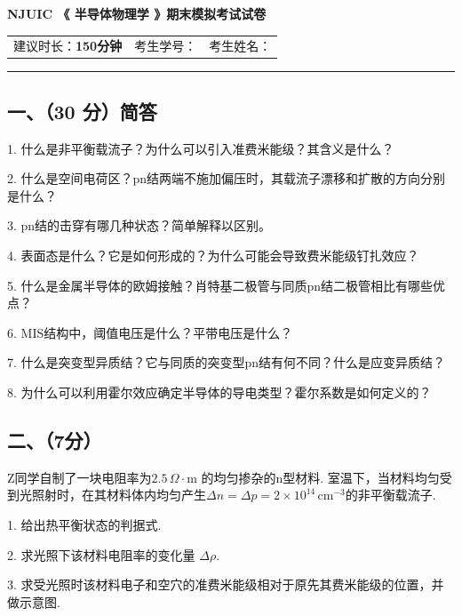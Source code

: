 \documentclass{ctexart}
\begin{document}
\vspace{1em}
\begin{center}

\textbf{\LARGE NJUIC 《 半导体物理学 》期末模拟考试试卷}
\end{center}

\begin{center}
\begin{tabular}{m{} m{} m{}}
     
     建议时长：\textbf{150分钟} & 考生学号：&考生姓名：
\end{tabular}
\end{center}
\vspace{-0.3cm}
\hrule height 0.5pt

\subsection*{一、（30 分）简答}

1. 什么是非平衡载流子？为什么可以引入准费米能级？其含义是什么？\par
2. 什么是空间电荷区？pn结两端不施加偏压时，其载流子漂移和扩散的方向分别是什么？ \par
3. pn结的击穿有哪几种状态？简单解释以区别。\par
4. 表面态是什么？它是如何形成的？为什么可能会导致费米能级钉扎效应？\par
5. 什么是金属半导体的欧姆接触？肖特基二极管与同质pn结二极管相比有哪些优点？\par
6. MIS结构中，阈值电压是什么？平带电压是什么？\par
7. 什么是突变型异质结？它与同质的突变型pn结有何不同？什么是应变异质结？\par
8. 为什么可以利用霍尔效应确定半导体的导电类型？霍尔系数是如何定义的？\par

\newpage

\subsection*{二、（7分）}

Z同学自制了一块电阻率为$2.5 \, \Omega \cdot $m 的均匀掺杂的n型材料. 室温下，当材料均匀受到光照射时，在其材料体内均匀产生$\Delta n = \Delta p =2 \times 10^{14} \, \text{cm}^{-3}$的非平衡载流子.\par
1. 给出热平衡状态的判据式.\par
2. 求光照下该材料电阻率的变化量 $ \Delta \rho $.\par
3. 求受光照时该材料电子和空穴的准费米能级相对于原先其费米能级的位置，并做示意图.\par
\end{document}
